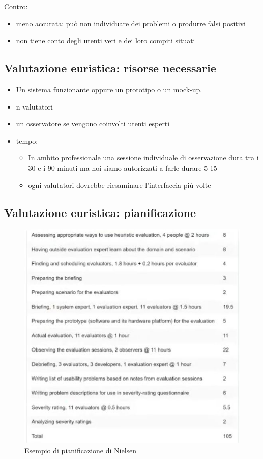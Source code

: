 \documentclass[11pt,a4paper]{book}
\begin{document}
Contro:
\begin{itemize}
	\item meno accurata: può non individuare dei problemi o produrre falsi positivi
	\item non tiene conto degli utenti veri e dei loro compiti situati
\end{itemize}

\subsection{Valutazione euristica: risorse necessarie}
\begin{itemize}
	\item Un sistema funzionante oppure un prototipo o un mock-up.
	\item n valutatori
	\item un osservatore se vengono coinvolti utenti esperti
	\item tempo:
	\begin{itemize}
		\item In ambito professionale una sessione individuale di osservazione dura tra i 30 e i 90 minuti ma noi siamo autorizzati a farle durare 5-15
		\item ogni valutatori dovrebbe riesaminare l'interfaccia più volte
	\end{itemize}
\end{itemize}

\subsection{Valutazione euristica: pianificazione}
\begin{figure}[h!]
	\begin{center}
		\includegraphics[scale=0.6]{img/017.jpg}
		\caption{Esempio di pianificazione di Nielsen}
		\label{fig: 017}
	\end{center}
\end{figure}
\end{document}
